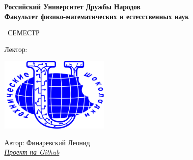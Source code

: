 \begin{titlepage}
	\clearpage\thispagestyle{empty}
	\centering
	
	\textbf{Российский Университет Дружбы Народов \\ Факультет физико-математических и естесственных наук}
	\vspace{33ex}
	
	{\textbf{\FullCourseNameFirstPart}}
	
	\SemesterNumber\ СЕМЕСТР  
	\vspace{1ex}
	
	Лектор: \textit{\LecturerInitials}

	\vspace{15mm}
	
	\includegraphics[width=0.4\textwidth]{images/logo.png}

	\begin{flushright}
		\noindent
		Автор: Финаревский Леонид
		\\
		\href{\VkLink}{\textit{Проект на Github}}
	\end{flushright}
	
	\vfill
	\CourseDate
	\pagebreak
\end{titlepage}